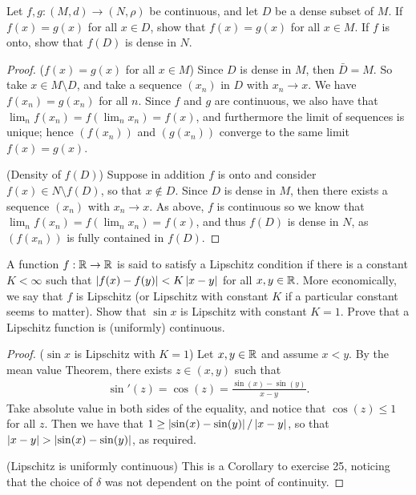\begin{exercise}{17}
Let $f,g:(M,d)\to(N,\rho)$ be continuous, and let $D$ be a dense subset of $M$.
If $f(x)=g(x)$ for all $x\in D$, show that $f(x)=g(x)$ for all $x\in M$.
If $f$ is onto, show that $f(D)$ is dense in $N$.
\end{exercise}
\begin{proof}
($f(x) =g(x)$ for all $x\in M$)
Since $D$ is dense in $M$, then $\bar{D} =M$.
So take $x\in M\setminus D$, and take a sequence $(x_n)$ in $D$ with $x_n\to x$.
We have $f(x_n)=g(x_n)$ for all $n$.
Since $f$ and $g$ are continuous, we also have that $\lim_n f(x_n) = f(\lim_n x_n) = f(x)$, and furthermore the limit of sequences is unique;
hence $(f(x_n))$ and $(g(x_n))$ converge to the same limit $f(x)=g(x)$.

(Density of $f(D)$)
Suppose in addition $f$ is onto and consider $f(x)\in N\setminus f(D)$, so that $x\notin D$.
Since $D$ is dense in $M$, then there exists a sequence $(x_n)$ with $x_n\to x$.
As above, $f$ is continuous so we know that $\lim_n f(x_n) = f(\lim_n x_n) = f(x)$, and thus $f(D)$ is dense in $N$, as $(f(x_n))$ is fully contained in $f(D)$.
\end{proof} 

\begin{exercise}{19}
A function $f:\mathbb{R}\to\mathbb{R}$ is said to satisfy a Lipschitz condition if there is a constant $K<\infty$ such that $\left\lvert f(x)-f(y)\right\rvert <K\left\lvert x-y\right\rvert$ for all $x,y\in\mathbb{R}$.
More economically, we say that $f$ is Lipschitz (or Lipschitz with constant $K$ if a particular constant seems to matter).
Show that $\sin x$ is Lipschitz with constant $K=1$.
Prove that a Lipschitz function is (uniformly) continuous.
\end{exercise}
\begin{proof}
($\sin x$ is Lipschitz with $K=1$)
Let $x,y\in\mathbb{R}$ and assume $x<y$.
By the mean value Theorem, there exists $z\in(x,y)$ such that
\begin{align*}
    \sin'(z)
    = \cos(z)
    = \frac{\sin(x)-\sin(y)}{x-y}.
\end{align*}
Take absolute value in both sides of the equality, and notice that $\cos(z)\leq 1$ for all $z$.
Then we have that
$1\geq\left\lvert \sin(x)-\sin(y)\right\rvert/\left\lvert x-y\right\rvert$, so that
$\left\lvert x-y\right\rvert>\left\lvert \sin(x)-\sin(y)\right\rvert$, as required.

(Lipschitz is uniformly continuous)
This is a Corollary to exercise 25, noticing that the choice of $\delta$ was not dependent on the point of continuity.
\end{proof} 

